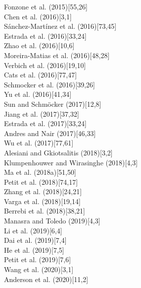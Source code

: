 \documentclass{article}
\begin{document}
\noindent \textrm{Fonzone et al. (2015)}[55,26]\\
\noindent \textrm{Chen et al. (2016)}[3,1]\\
\noindent \textrm{Sánchez-Martínez et al. (2016)}[73,45]\\
\noindent \textrm{Estrada et al. (2016)}[33,24]\\
\noindent \textrm{Zhao et al. (2016)}[10,6]\\
\noindent \textrm{Moreira-Matias et al. (2016)}[48,28]\\
\noindent \textrm{Verbich et al. (2016)}[19,10]\\
\noindent \textrm{Cats et al. (2016)}[77,47]\\
\noindent \textrm{Schmocker et al. (2016)}[39,26]\\
\noindent \textrm{Yu et al. (2016)}[41,34]\\
\noindent \textrm{Sun and Schmöcker (2017)}[12,8]\\
\noindent \textrm{Jiang et al. (2017)}[37,32]\\
\noindent \textrm{Estrada et al. (2017)}[33,24]\\
\noindent \textrm{Andres and Nair (2017)}[46,33]\\
\noindent \textrm{Wu et al. (2017)}[77,61]\\
\noindent \textrm{Alesiani and Gkiotsalitis (2018)}[3,2]\\
\noindent \textrm{Klumpenhouwer and Wirasinghe (2018)}[4,3]\\
\noindent \textrm{Ma et al. (2018a)}[51,50]\\
\noindent \textrm{Petit et al. (2018)}[74,17]\\
\noindent \textrm{Zhang et al. (2018)}[24,21]\\
\noindent \textrm{Varga et al. (2018)}[19,14]\\
\noindent \textrm{Berrebi et al. (2018)}[38,21]\\
\noindent \textrm{Manasra and Toledo (2019)}[4,3]\\
\noindent \textrm{Li et al. (2019)}[6,4]\\
\noindent \textrm{Dai et al. (2019)}[7,4]\\
\noindent \textrm{He et al. (2019)}[7,5]\\
\noindent \textrm{Petit et al. (2019)}[7,6]\\
\noindent \textrm{Wang et al. (2020)}[3,1]\\
\noindent \textrm{Anderson et al. (2020)}[11,2]\\
\end{document}
